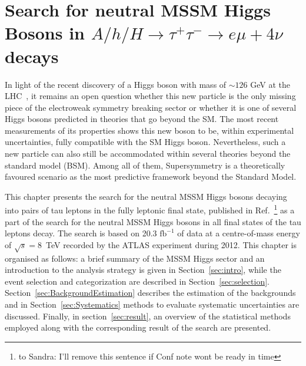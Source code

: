 \chapter[Neutral MSSM Higgs Bosons Search]{Search for neutral MSSM Higgs Bosons in  
$A/h/H \rightarrow \tau^{+}\tau^{-} \rightarrow e \mu + 4\nu$ decays} \label{chap:anal}


%
 \vspace{0.5cm}

%
%
In light of the recent discovery of a Higgs 
boson with mass of $\sim 126$ GeV at the LHC~\cite{AHiggsO,CHiggsO}, it remains an open question
whether this new particle is the only missing piece of the electroweak symmetry breaking
sector or whether it is one of several Higgs bosons predicted in  theories 
that go beyond the SM. The most recent measurements \cite{ASpin0,ACouplings,CFermions,CWidth} of its
properties shows this new boson to be, within experimental uncertainties, fully
compatible with the SM Higgs boson. Nevertheless, such a new particle can also still
be accommodated within several theories beyond the 
standard model (BSM). Among all of them, Supersymmetry  is a theoretically favoured scenario
as the most predictive framework beyond the Standard Model.

This chapter presents the search for the neutral MSSM Higgs bosons decaying into pairs of tau leptons
in the fully leptonic final state, published in Ref.~\cite{}\footnote{to Sandra: I'll remove this sentence
if Conf note wont be ready in time} as a part of the search for the neutral
MSSM Higgs bosons in all final states of the tau leptons decay. 
The search is based on 20.3 $\text{fb}^{-1}$ of  data at a centre-of-mass energy of $\sqrt{s} = 8$~TeV
recorded by the ATLAS experiment during 2012.
This chapter is organised as follows: a brief summary of the MSSM Higgs sector 
and an introduction to the analysis strategy is given in Section~\ref{sec:intro},
while the event selection and categorization are described in Section~\ref{sec:selection}. 
Section~\ref{sec:BackgroundEstimation} describes the estimation of the backgrounds and
in Section~\ref{sec:Systematics} methods to evaluate systematic uncertainties are discussed. Finally, 
in section~\ref{sec:result}, an overview of the statistical methods employed along with the corresponding
result of the search are presented.

